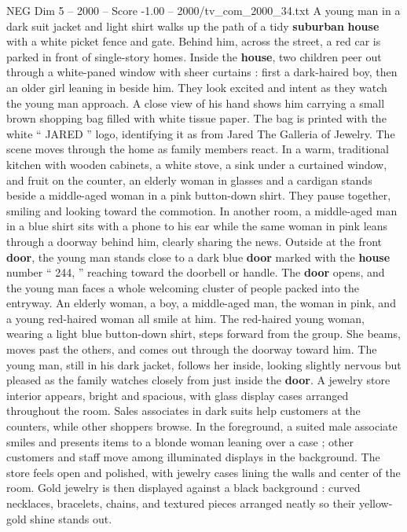 \begin{textsample}{NEG Dim 5 – 2000 – Score -1.00 – 2000/tv\_com\_2000\_34.txt}  \label{ex:f5_neg_079}
A young man in a dark suit jacket and light shirt walks up the path of a tidy \textbf{suburban} \textbf{house} with a white picket fence and gate.
Behind him, across the street, a red car is parked in front of single-story homes.
Inside the \textbf{house}, two children peer out through a white-paned window with sheer curtains : first a dark-haired boy, then an older girl leaning in beside him.
They look excited and intent as they watch the young man approach.
A close view of his hand shows him carrying a small brown shopping bag filled with white tissue paper.
The bag is printed with the white “ JARED ” logo, identifying it as from Jared The Galleria of Jewelry.
The scene moves through the home as family members react.
In a warm, traditional kitchen with wooden cabinets, a white stove, a sink under a curtained window, and fruit on the counter, an elderly woman in glasses and a cardigan stands beside a middle-aged woman in a pink button-down shirt.
They pause together, smiling and looking toward the commotion.
In another room, a middle-aged man in a blue shirt sits with a phone to his ear while the same woman in pink leans through a doorway behind him, clearly sharing the news.
Outside at the front \textbf{door}, the young man stands close to a dark blue \textbf{door} marked with the \textbf{house} number “ 244, ” reaching toward the doorbell or handle.
The \textbf{door} opens, and the young man faces a whole welcoming cluster of people packed into the entryway.
An elderly woman, a boy, a middle-aged man, the woman in pink, and a young red-haired woman all smile at him.
The red-haired young woman, wearing a light blue button-down shirt, steps forward from the group.
She beams, moves past the others, and comes out through the doorway toward him.
The young man, still in his dark jacket, follows her inside, looking slightly nervous but pleased as the family watches closely from just inside the \textbf{door}.
A jewelry store interior appears, bright and spacious, with glass display cases arranged throughout the room.
Sales associates in dark suits help customers at the counters, while other shoppers browse.
In the foreground, a suited male associate smiles and presents items to a blonde woman leaning over a case ; other customers and staff move among illuminated displays in the background.
The store feels open and polished, with jewelry cases lining the walls and center of the room.
Gold jewelry is then displayed against a black background : curved necklaces, bracelets, chains, and textured pieces arranged neatly so their yellow-gold shine stands out.

\end{textsample}
